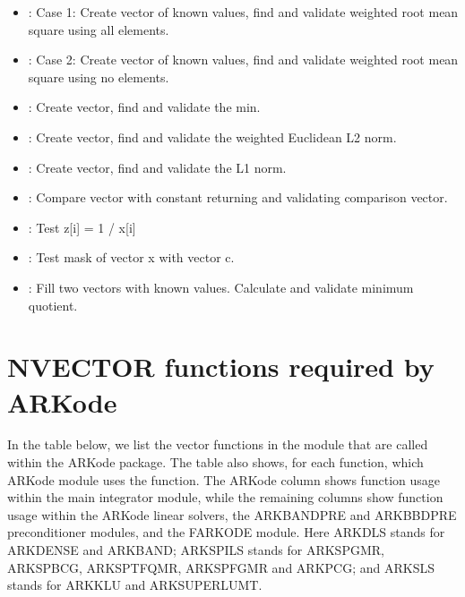 \documentclass[letterpaper,10pt,english]{sphinxmanual}
\begin{document}
\begin{itemize}
\item {} 
: Case 1: Create vector of known values, find and validate weighted root mean square using all elements.

\item {} 
: Case 2: Create vector of known values, find and validate weighted root mean square using no elements.

\item {} 
: Create vector, find and validate the min.

\item {} 
: Create vector, find and validate the weighted Euclidean L2 norm.

\item {} 
: Create vector, find and validate the L1 norm.

\item {} 
: Compare vector with constant returning and validating comparison vector.

\item {} 
: Test z{[}i{]} = 1 / x{[}i{]}

\item {} 
: Test mask of vector x with vector c.

\item {} 
: Fill two vectors with known values. Calculate and validate minimum quotient.

\end{itemize}


\section{NVECTOR functions required by ARKode}
\label{nvectors/ARKode_requirements::doc}\label{nvectors/ARKode_requirements:nvector-functions-required-by-arkode}\label{nvectors/ARKode_requirements:nvectors-arkode}
In the table below, we list the vector functions in the 
module that are called within the ARKode package.  The table also
shows, for each function, which ARKode module uses the function.
The ARKode column shows function usage within the main integrator
module,  while the remaining columns show function usage within
the ARKode linear solvers, the ARKBANDPRE and ARKBBDPRE
preconditioner modules, and the FARKODE module.  Here ARKDLS stands
for ARKDENSE and ARKBAND; ARKSPILS stands for ARKSPGMR, ARKSPBCG,
ARKSPTFQMR, ARKSPFGMR and ARKPCG; and ARKSLS stands for ARKKLU and
ARKSUPERLUMT.
\end{document}
